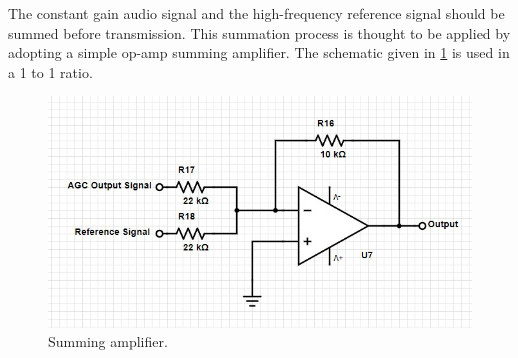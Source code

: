 \documentclass[a4paper,10pt]{IEEEtran}
\begin{document}
The constant gain audio signal and the high-frequency reference signal should be summed before transmission. This summation process is thought to be applied by adopting a simple op-amp summing amplifier. The schematic given in \ref{summing} is used in a 1 to 1 ratio.
\begin{figure}[htbp!]
    \centering
    \includegraphics[width = 1\linewidth]{Summing Amplifier.jpg}
    \caption{Summing amplifier.}
    \label{summing}
\end{figure} 
\end{document}
